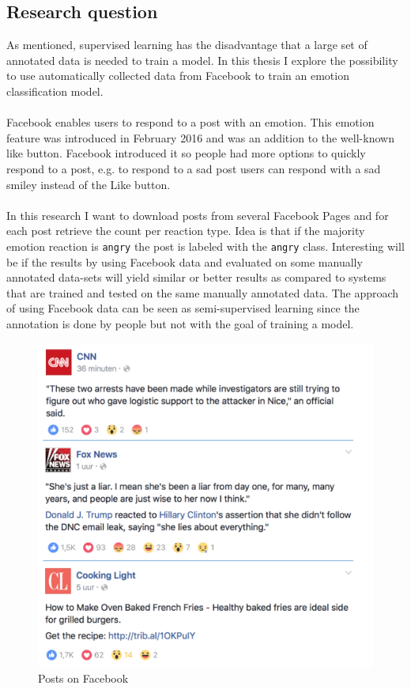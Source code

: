 \documentclass[
10pt, %
a4paper, %
oneside, %
headinclude,footinclude, %
BCOR5mm, %
]{scrartcl}
\begin{document}
\subsection{Research question}
As mentioned, supervised learning has the disadvantage that a large set of annotated data is needed to train a model. In this thesis I explore the possibility to use automatically collected data from Facebook to train an emotion classification model.\\\\
Facebook enables users to respond to a post with an emotion. This emotion feature was introduced in February 2016 and was an addition to the well-known like button. Facebook introduced it so people had more options to quickly respond to a post, e.g. to respond to a sad post users can respond with a sad smiley instead of the Like button.\\\\
In this research I want to download posts from several Facebook Pages and for each post retrieve the count per reaction type. Idea is that if the majority emotion reaction is \texttt{angry} the post is labeled with the \texttt{angry} class. Interesting will be if the results by using Facebook data and evaluated on some manually annotated data-sets will yield similar or better results as compared to systems that are trained and tested on the same manually annotated data. The approach of using Facebook data can be seen as semi-supervised learning since the annotation is done by people but not with the goal of training a model.\\
\begin{figure}
  \includegraphics[width=\linewidth]{example_posts.png}
  \caption{Posts on Facebook}
  \label{fig:example_facebook_posts}
\end{figure}\\
\end{document}
